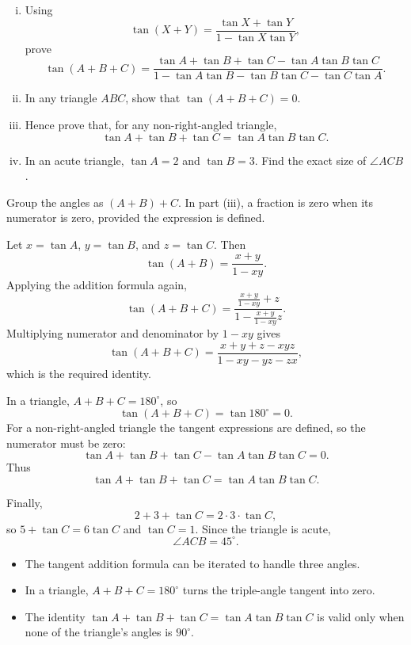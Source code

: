 \begin{problem}
\begin{enumerate}[(i)]
  \item Using
  \[
  \tan(X+Y)=\frac{\tan X+\tan Y}{1-\tan X\tan Y},
  \]
  prove
  \[
  \tan(A+B+C)
  =
  \frac{\tan A+\tan B+\tan C-\tan A\tan B\tan C}
       {1-\tan A\tan B-\tan B\tan C-\tan C\tan A}.
  \]
  \item In any triangle $ABC$, show that $\tan(A+B+C)=0$.
  \item Hence prove that, for any non-right-angled triangle,
  \[
  \tan A+\tan B+\tan C=\tan A\tan B\tan C.
  \]
  \item In an acute triangle, $\tan A=2$ and $\tan B=3$. Find the exact size of
        $\angle ACB$.
\end{enumerate}
\end{problem}

\begin{hintbox}
Group the angles as $(A+B)+C$. In part (iii), a fraction is zero when its
numerator is zero, provided the expression is defined.
\end{hintbox}

\begin{solution}
Let $x=\tan A$, $y=\tan B$, and $z=\tan C$. Then
\[
\tan(A+B)=\frac{x+y}{1-xy}.
\]
Applying the addition formula again,
\[
\tan(A+B+C)
=
\frac{\frac{x+y}{1-xy}+z}
     {1-\frac{x+y}{1-xy}z}.
\]
Multiplying numerator and denominator by $1-xy$ gives
\[
\tan(A+B+C)=
\frac{x+y+z-xyz}{1-xy-yz-zx},
\]
which is the required identity.

In a triangle, $A+B+C=180^\circ$, so
\[
\tan(A+B+C)=\tan180^\circ=0.
\]
For a non-right-angled triangle the tangent expressions are defined, so the
numerator must be zero:
\[
\tan A+\tan B+\tan C-\tan A\tan B\tan C=0.
\]
Thus
\[
\tan A+\tan B+\tan C=\tan A\tan B\tan C.
\]

Finally,
\[
2+3+\tan C=2\cdot3\cdot\tan C,
\]
so $5+\tan C=6\tan C$ and $\tan C=1$. Since the triangle is acute,
\[
\angle ACB=45^\circ.
\]
\end{solution}

\begin{takeaways}
\begin{itemize}[leftmargin=*]
  \item The tangent addition formula can be iterated to handle three angles.
  \item In a triangle, $A+B+C=180^\circ$ turns the triple-angle tangent into
        zero.
  \item The identity
        $\tan A+\tan B+\tan C=\tan A\tan B\tan C$ is valid only when none of the
        triangle's angles is $90^\circ$.
\end{itemize}
\end{takeaways}

